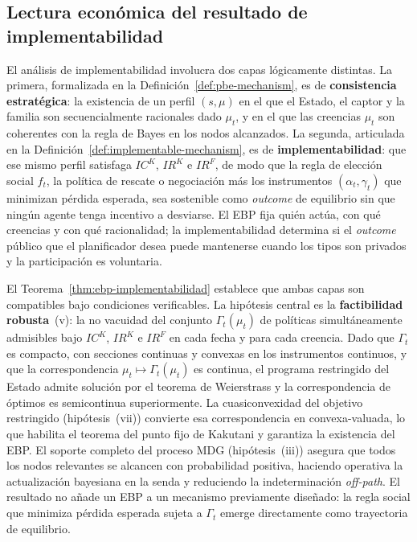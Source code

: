 \documentclass[12pt]{article}
\providecommand{\parencite}{\citep}
\theoremstyle{definition}
\theoremstyle{remark}
\newcommand{\1}{\mathbf{1}}
\begin{document}
\subsection{Lectura económica del resultado de implementabilidad}

\noindent El análisis de implementabilidad involucra dos capas lógicamente distintas. La primera, formalizada en la Definición~\ref{def:pbe-mechanism}, es de \textbf{consistencia estratégica}: la existencia de un perfil $(s,\mu)$ en el que el Estado, el captor y la familia son secuencialmente racionales dado $\mu_t$, y en el que las creencias $\mu_t$ son coherentes con la regla de Bayes en los nodos alcanzados. La segunda, articulada en la Definición~\ref{def:implementable-mechanism}, es de \textbf{implementabilidad}: que ese mismo perfil satisfaga $IC^K$, $IR^K$ e $IR^F$, de modo que la regla de elección social $f_t$, la política de rescate o negociación más los instrumentos $(\alpha_t,\gamma_t)$ que minimizan pérdida esperada, sea sostenible como \emph{outcome} de equilibrio sin que ningún agente tenga incentivo a desviarse. El EBP fija quién actúa, con qué creencias y con qué racionalidad; la implementabilidad determina si el \emph{outcome} público que el planificador desea puede mantenerse cuando los tipos son privados y la participación es voluntaria.

\medskip

\noindent El Teorema~\ref{thm:ebp-implementabilidad} establece que ambas capas son compatibles bajo condiciones verificables. La hipótesis central es la \textbf{factibilidad robusta}~\textup{(v)}: la no vacuidad del conjunto $\Gamma_t(\mu_t)$ de políticas simultáneamente admisibles bajo $IC^K$, $IR^K$ e $IR^F$ en cada fecha y para cada creencia. Dado que $\Gamma_t$ es compacto, con secciones continuas y convexas en los instrumentos continuos, y que la correspondencia $\mu_t\mapsto\Gamma_t(\mu_t)$ es continua, el programa restringido del Estado admite solución por el teorema de Weierstrass y la correspondencia de óptimos es semicontinua superiormente. La cuasiconvexidad del objetivo restringido \textup{(}hipótesis~\textup{(vii)}\textup{)} convierte esa correspondencia en convexa-valuada, lo que habilita el teorema del punto fijo de Kakutani \parencite{Kakutani1941} y garantiza la existencia del EBP. El soporte completo del proceso MDG \textup{(}hipótesis~\textup{(iii)}\textup{)} asegura que todos los nodos relevantes se alcancen con probabilidad positiva, haciendo operativa la actualización bayesiana en la senda y reduciendo la indeterminación \emph{off-path}. El resultado no añade un EBP a un mecanismo previamente diseñado: la regla social que minimiza pérdida esperada sujeta a $\Gamma_t$ emerge directamente como trayectoria de equilibrio.
\end{document}
